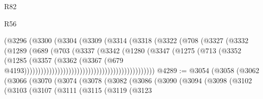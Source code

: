 \begin{lexlean}{R82}
\begin{lexlean}{R56}
\begin{coremodule}
{{{{{{{{{{{{{{{{{{{{{{{{{{{{{{{{{{{{{{{{{{{{{{{{{{{{{{{{{{{{{{{{{{{{{{{{{{{{{{{{{{{{{{{{{{{{{{{{{{{{{{{{{{{{{{{{{{{{{{{{{{{{{{{{{{{{{{{{{{{{{{{{{{{{{{{{{{{{{{{{{{{{{{{{{{{{{{{{{{{{{{{{{{{{{{{{{{{{{{{{{{{{{{{{{{{                                                (@3296
                                                  (@3300
                                                    (@3304
                                                      (@3309
                                                        (@3314
                                                          (@3318
                                                            (@3322
                                                              (@708
                                                                (@3327
                                                                  (@3332
                                                                    (@1289
                                                                      (@689
                                                                        (@703
                                                                          (@3337
                                                                            (@3342
                                                                              (@1280
                                                                                (@3347
                                                                                  (@1275
                                                                                    (@713
                                                                                      (@3352
                                                                                        (@1285
                                                                                          (@3357
                                                                                            (@3362
                                                                                              (@3367
                                                                                                (@679
                                                                                                  @4193)))))))))))))))))))))))))))))))))))))))))))))))
@4289 := @3054
    (@3058
      (@3062
        (@3066
          (@3070
            (@3074
              (@3078
                (@3082
                  (@3086
                    (@3090
                      (@3094
                        (@3098
                          (@3102
                            (@3103
                              (@3107
                                (@3111
                                  (@3115
                                    (@3119
                                      (@3123
}}}}}}}}}}}}}}}}}}}}}}}}}}}}}}}}}}}}}}}}}}}}}}}}}}}}}}}}}}}}}}}}}}}}}}}}}}}}}}}}}}}}}}}}}}}}}}}}}}}}}}}}}}}}}}}}}}}}}}}}}}}}}}}}}}}}}}}}}}}}}}}}}}}}}}}}}}}}}}}}}}}}}}}}}}}}}}}}}}}}}}}}}}}}}}}}}}}}}}}}}}}}}}}}}}}
\end{coremodule}
\end{lexlean}
\end{lexlean}
